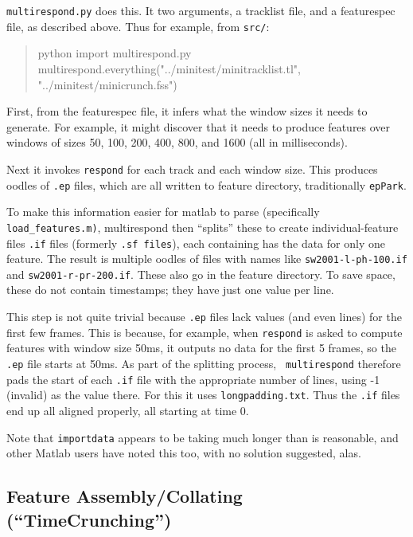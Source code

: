 \documentclass[11pt]{article}
\begin{document}
{\tt multirespond.py} does this.  It two arguments, a tracklist file, and a
featurespec file, as described above. 
Thus for example, from {\tt src/}:

\begin{quote}
python 
import multirespond.py
multirespond.everything("../minitest/minitracklist.tl", "../minitest/minicrunch.fss")
\end{quote}

First, from the featurespec file, it infers what the window sizes it
needs to generate.  For example, it might discover that it needs to
produce features over windows of sizes 50, 100, 200, 400, 800, and
1600 (all in milliseconds).

Next it invokes {\tt respond} for each track and each window size.
This produces oodles of {\tt .ep} files, which are all written to
feature directory, traditionally {\tt epPark}.

To make this information easier for matlab to parse (specifically {\tt
  load\_features.m)}, multirespond then ``splits'' these to create
individual-feature files {\tt .if} files (formerly {\tt .sf files}),
each containing has the data for only one feature.  The result is
multiple oodles of files with names like {\tt sw2001-l-ph-100.if} and
{\tt sw2001-r-pr-200.if}.  These also go in the feature directory.  To
save space, these do not contain timestamps; they have just one value
per line.

This step is not quite trivial because {\tt .ep} files lack values
(and even lines) for the first few frames.  This is because, for
example, when {\tt respond} is asked to compute features with window
size 50ms, it outputs no data for the first 5 frames, so the {\tt .ep}
file starts at 50ms.  As part of the splitting process, {\tt
  multirespond} therefore pads the start of each {\tt .if} file with
the appropriate number of lines, using -1 (invalid) as the value
there.  For this it uses {\tt longpadding.txt}. Thus the {\tt .if}
files end up all aligned properly, all starting at time 0.

Note that {\tt importdata} appears to be taking much longer than is
reasonable, and other Matlab users have noted this too, with no
solution suggested, alas.  

\subsection{Feature Assembly/Collating (``TimeCrunching'')}
\end{document}
